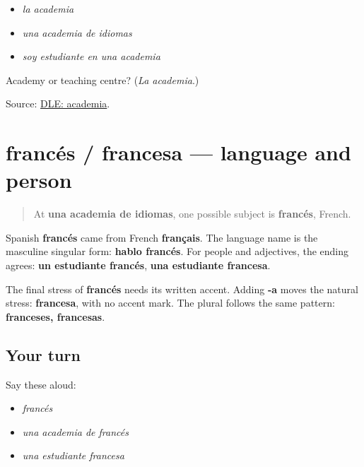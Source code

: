 \begin{itemize}
\raggedright
  \item \emph{la academia}
  \item \emph{una academia de idiomas}
  \item \emph{soy estudiante en una academia}
\end{itemize}

\begin{tcolorbox}[breakable,colback=teal!4,colframe=teal!35!black,title={Before you move on}]
Academy or teaching centre? (\emph{La academia}.)

Source: \href{https://dle.rae.es/academia}{DLE: academia}.
\end{tcolorbox}
\section[francés / francesa]{francés / francesa — language and person}

\label{lesson:ES-C410-frances}



\begin{quote}
At \textbf{una academia de idiomas}, one possible subject is \textbf{francés}, French.
\end{quote}

\begin{cousinweb}
Spanish \textbf{francés} came from French \textbf{français}. The language name is the masculine singular form: \textbf{hablo francés}. For people and adjectives, the ending agrees: \textbf{un estudiante francés}, \textbf{una estudiante francesa}.
\end{cousinweb}

\begin{grammarlens}[title={Grammar Lens: the accent comes and goes}]
The final stress of \textbf{francés} needs its written accent. Adding \textbf{-a} moves the natural stress: \textbf{francesa}, with no accent mark. The plural follows the same pattern: \textbf{franceses, francesas}.
\end{grammarlens}

\subsection*{Your turn}
Say these aloud:

\begin{itemize}
\raggedright
  \item \emph{francés}
  \item \emph{una academia de francés}
  \item \emph{una estudiante francesa}
\end{itemize}

